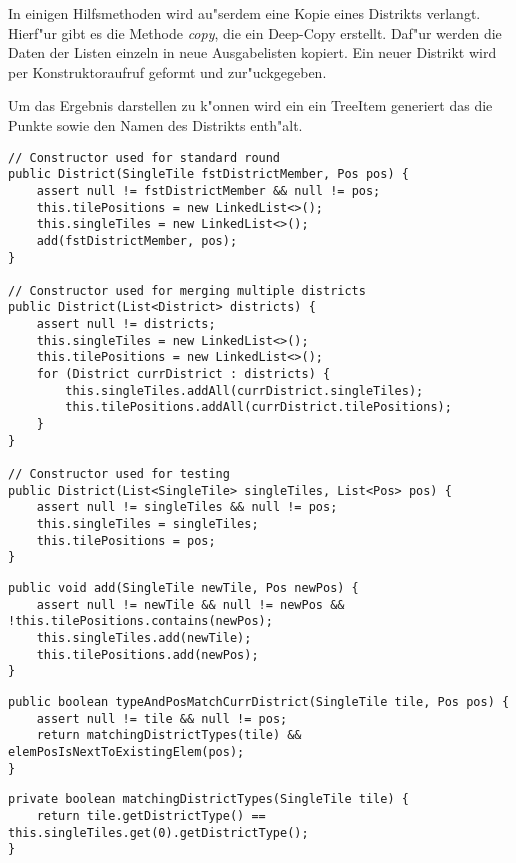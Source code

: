 In einigen Hilfsmethoden wird au"serdem eine Kopie eines Distrikts verlangt. Hierf"ur gibt es die Methode \emph{copy}, die ein Deep-Copy erstellt. Daf"ur werden die Daten der Listen einzeln in neue Ausgabelisten kopiert. Ein neuer Distrikt wird per Konstruktoraufruf geformt und zur"uckgegeben. 

Um das Ergebnis darstellen zu k"onnen wird ein ein TreeItem generiert das die Punkte sowie den Namen des Distrikts enth"alt. 
\begin{lstlisting}[style=CodeHighlighting,float,caption=District - Konstruktoren,label=district_konstruktoren]
// Constructor used for standard round
public District(SingleTile fstDistrictMember, Pos pos) {
    assert null != fstDistrictMember && null != pos;
    this.tilePositions = new LinkedList<>();
    this.singleTiles = new LinkedList<>();
    add(fstDistrictMember, pos);
}

// Constructor used for merging multiple districts
public District(List<District> districts) {
    assert null != districts;
    this.singleTiles = new LinkedList<>();
    this.tilePositions = new LinkedList<>();
    for (District currDistrict : districts) {
        this.singleTiles.addAll(currDistrict.singleTiles);
        this.tilePositions.addAll(currDistrict.tilePositions);
    }
}

// Constructor used for testing 
public District(List<SingleTile> singleTiles, List<Pos> pos) {
    assert null != singleTiles && null != pos;
    this.singleTiles = singleTiles;
    this.tilePositions = pos;
}
\end{lstlisting}
\begin{lstlisting}[style=CodeHighlighting,float,caption=District - add,label=district_add]
public void add(SingleTile newTile, Pos newPos) {
    assert null != newTile && null != newPos && !this.tilePositions.contains(newPos);
    this.singleTiles.add(newTile);
    this.tilePositions.add(newPos);
}
\end{lstlisting}
\begin{lstlisting}[style=CodeHighlighting,float,caption=District - typeAndPosMatchCurrDistrict,label=lst:district_typeAndPosMatchCurrDistrict]
public boolean typeAndPosMatchCurrDistrict(SingleTile tile, Pos pos) {
    assert null != tile && null != pos;
    return matchingDistrictTypes(tile) && elemPosIsNextToExistingElem(pos);
}
\end{lstlisting}
\begin{lstlisting}[style=CodeHighlighting,float,caption=District - matchingDistrictTypes,label=lst:district_matchingDistrictTypes]
private boolean matchingDistrictTypes(SingleTile tile) {
    return tile.getDistrictType() == this.singleTiles.get(0).getDistrictType();
}
\end{lstlisting}
